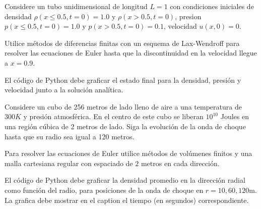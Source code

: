 \documentclass[11pt,letterpaper]{exam}
\begin{document}
\begin{questions}

Considere un tubo unidimensional de longitud $L=1$ con condiciones
iniciales de densidad $\rho(x\leq 0.5,t=0)=1.0$ y $\rho(x>0.5,t=0)$,
presion $p(x\leq0.5, t=0)=1.0$ y $p(x>0.5,t=0)=0.1$, velocidad
$u(x,0)=0$.

Utilice m\'etodos de diferencias finitas con un esquema de
Lax-Wendroff para resolver las ecuaciones de Euler hasta que la
discontinuidad en la velocidad llegue a $x=0.9$.

El c\'odigo de Python debe graficar el estado final para la densidad,
presi\'on y velocidad junto a la soluci\'on anal\'itica.
 

Considere un cubo de 256 metros de lado lleno de aire a una
temperatura de $300 K$ y presi\'on atmosf\'erica.
En el centro de este cubo se liberan $10^{10}$ Joules en una regi\'on
c\'ubica de 2 metros de lado. Siga la evoluci\'on de la onda de choque
hasta que su radio sea igual a 120 metros.

Para resolver las ecuaciones de Euler utilice m\'etodos de vol\'umenes
finitos y una malla cartesiana regular con espaciado de $2$ metros en
cada direcci\'on. 

El c\'odigo de Python debe graficar la densidad
promedio en la direcci\'on radial como funci\'on del radio, para
posiciones de la onda de choque en $r=10,60,120$m. La grafica debe
mostrar en el caption el tiempo (en segundos) correspondiente. 

\end{questions}
\end{document}
